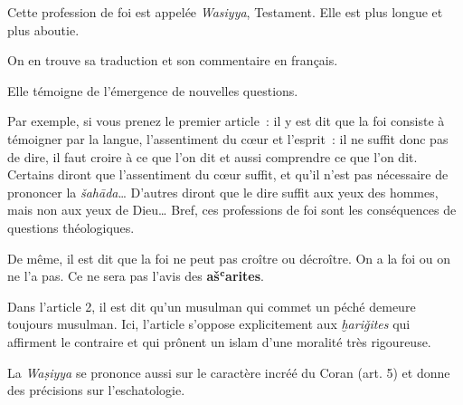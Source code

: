 \begin{Def}
Cette profession de foi est appelée \emph{Wasiyya}, Testament. Elle est
plus longue et plus aboutie.
\end{Def}




{On en trouve sa traduction et son
commentaire en français.
}

Elle témoigne de l'émergence de nouvelles questions.

Par exemple, si vous prenez le premier article~: il y est dit que la foi
consiste à témoigner par la langue, l'assentiment du cœur et l'esprit~:
il ne suffit donc pas de dire, il faut croire à ce que l'on dit et aussi
comprendre ce que l'on dit. Certains diront que l'assentiment du cœur
suffit, et qu'il n'est pas nécessaire de prononcer la
\emph{šahāda}\ldots{} D'autres diront que le dire suffit aux yeux des
hommes, mais non aux yeux de Dieu\ldots{} Bref, ces professions de foi
sont les conséquences de questions théologiques.

De même, il est dit que la foi ne peut pas croître ou décroître. On a la
foi ou on ne l'a pas. Ce ne sera pas l'avis des \textbf{ašʿarites}.

Dans l'article 2, il est dit qu'un musulman qui commet un péché demeure
toujours musulman. Ici, l'article s'oppose explicitement aux
\emph{ḫariǧites} qui affirment le contraire et qui prônent un islam
d'une moralité très rigoureuse.

La \emph{Waṣiyya} se prononce aussi sur le caractère incréé du Coran
(art. 5) et donne des précisions sur l'eschatologie.

